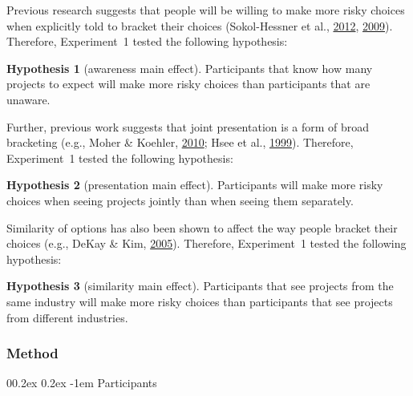\documentclass[
  english,
  man, donotrepeattitle,floatsintext]{apa7}
\makeatletter
\let\oldparagraph\paragraph
\renewcommand{\paragraph}[1]{\oldparagraph{#1}\mbox{}}
\renewcommand{\paragraph}{\@startsection{paragraph}{4}{\parindent}%
  {0\baselineskip \@plus 0.2ex \@minus 0.2ex}%
  {-1em}%
  {\normalfont\normalsize\bfseries\itshape\typesectitle}}
\theoremstyle{definition}
\theoremstyle{definition}
\theoremstyle{definition}
\theoremstyle{definition}
\newtheorem{hypothesis}{Hypothesis}
\theoremstyle{remark}
\makeatother
\begin{document}
Previous research suggests that people will be willing to make more risky
choices when explicitly told to bracket their choices (Sokol-Hessner et al., \protect\hyperlink{ref-sokolhessner2012}{2012}, \protect\hyperlink{ref-sokolhessner2009}{2009}). Therefore, Experiment~1 tested the following hypothesis:

\begin{hypothesis}[awareness main effect]
\protect\hypertarget{hyp:awareness-aggregation-1}{}{\label{hyp:awareness-aggregation-1} \iffalse (awareness main effect) \fi{} }Participants that know how many projects to expect will make more risky choices
than participants that are unaware.
\end{hypothesis}

Further, previous work suggests that joint presentation is a form of broad
bracketing (e.g., Moher \& Koehler, \protect\hyperlink{ref-moher2010}{2010}; Hsee et al., \protect\hyperlink{ref-hsee1999}{1999}). Therefore, Experiment~1 tested the
following hypothesis:

\begin{hypothesis}[presentation main effect]
\protect\hypertarget{hyp:presentation-aggregation-1}{}{\label{hyp:presentation-aggregation-1} \iffalse (presentation main effect) \fi{} }Participants will make more risky choices when seeing projects jointly than when
seeing them separately.
\end{hypothesis}

Similarity of options has also been shown to affect the way people bracket their
choices (e.g., DeKay \& Kim, \protect\hyperlink{ref-dekay2005}{2005}). Therefore, Experiment~1 tested the following hypothesis:

\begin{hypothesis}[similarity main effect]
\protect\hypertarget{hyp:similarity-aggregation-1}{}{\label{hyp:similarity-aggregation-1} \iffalse (similarity main effect) \fi{} }Participants that see projects from the same industry will make more risky
choices than participants that see projects from different industries.
\end{hypothesis}

\hypertarget{method}{%
\subsubsection{Method}\label{method}}

\hypertarget{participants}{%
\paragraph{Participants}\label{participants}}
\end{document}
